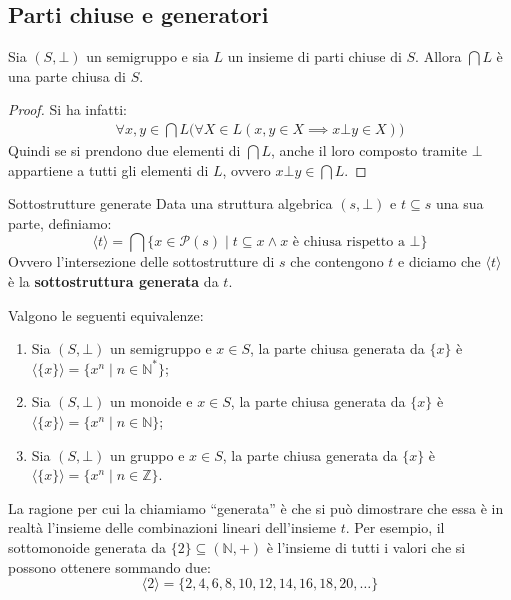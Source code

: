 \subsection{Parti chiuse e generatori}
\begin{propbox}
	Sia $(S,\bot)$ un semigruppo e sia $L$ un insieme di parti chiuse di $S$. Allora $\bigcap L$ è una parte chiusa di $S$.
\end{propbox}
\begin{proof}
	Si ha infatti:
	\begin{align*}
		\forall x,y \in \bigcap L \bigl( \forall X \in L ( x,y\in X \implies x \bot y \in X ) \bigr)
	\end{align*}
	Quindi se si prendono due elementi di $ \bigcap L$, anche il loro composto tramite $\bot$ appartiene a tutti gli elementi di $L$, ovvero $x \bot y \in \bigcap L$.
\end{proof}

\begin{defbox}{Sottostrutture generate}
	Data una struttura algebrica $(s,\bot)$ e $t \subseteq s$ una sua parte, definiamo:
	\begin{equation}
		\langle t \rangle  = \bigcap \{x \in \mathcal{P}(s) \; | \; t \subseteq x \land \text{$x$ è chiusa rispetto a $\bot$} \}
	\end{equation}
	Ovvero l'intersezione delle sottostrutture di $s$ che contengono $t$ e diciamo che $\langle t \rangle$ è la \textbf{sottostruttura generata} da $t$.
\end{defbox}

\begin{teorbox}
	Valgono le seguenti equivalenze:
	\begin{enumerate}
		\item Sia $(S,\bot)$ un semigruppo e $x \in S$, la parte chiusa generata da $\{x\}$ è $\langle \{x\} \rangle =\{x^{n} \; | \; n \in \mathbb{N}^* \}$;
		\item Sia $(S,\bot)$ un monoide e $x \in S$, la parte chiusa generata da $\{x\}$ è $\langle \{x\} \rangle = \{x^{n} \; | \; n \in \mathbb{N}\}$;
		\item Sia $(S,\bot)$ un gruppo e $x \in S$, la parte chiusa generata da $\{x\}$ è $\langle \{x\} \rangle  = \{x^{n} \; | \; n \in \mathbb{Z}\}$.
	\end{enumerate}
\end{teorbox}

\begin{osservation}
	La ragione per cui la chiamiamo ``generata'' è che si può dimostrare che essa è in realtà l’insieme delle combinazioni lineari dell’insieme $t$. Per esempio, il sottomonoide generata da  $\{2\} \subseteq (\mathbb{N}, +)$ è l’insieme di tutti i valori che si	possono ottenere sommando due: $$\langle2 \rangle= \{2, 4, 6, 8, 10, 12, 14, 16, 18, 20, \dots\}$$
\end{osservation}

